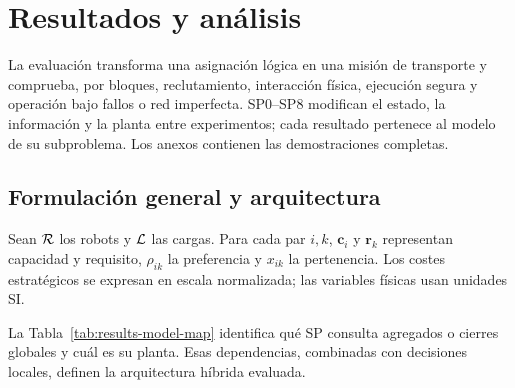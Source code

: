 \section{Resultados y análisis}
\label{sec:results}

La evaluación transforma una asignación lógica en una misión de transporte y comprueba, por bloques, reclutamiento, interacción física, ejecución segura y operación bajo fallos o red imperfecta. SP0--SP8 modifican el estado, la información y la planta entre experimentos; cada resultado pertenece al modelo de su subproblema. Los anexos contienen las demostraciones completas.

\subsection{Formulación general y arquitectura}
\label{subsec:common-formulation}

Sean \(\mathcal{R}\) los robots y \(\mathcal{L}\) las cargas. Para cada par \(i,k\), \(\boldsymbol c_i\) y \(\boldsymbol r_k\) representan capacidad y requisito, \(\rho_{ik}\) la preferencia y \(x_{ik}\) la pertenencia. Los costes estratégicos se expresan en escala normalizada; las variables físicas usan unidades SI.

La Tabla~\ref{tab:results-model-map} identifica qué SP consulta agregados o cierres globales y cuál es su planta. Esas dependencias, combinadas con decisiones locales, definen la arquitectura híbrida evaluada.

